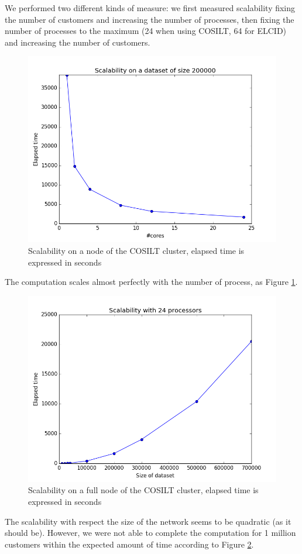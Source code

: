 \documentclass[a4paper,11pt]{book}
\begin{document}
We performed two different kinds of measure: we first measured scalability fixing the number of customers and increasing the number of processes, then fixing the number of processes to the maximum (24 when using COSILT, 64 for ELCID) and increasing the number of customers.
 \begin{figure}[H]
\centering
\includegraphics[height=7.0 cm,width=10 cm]{label_200K.png}
\caption{Scalability on a node of the COSILT cluster, elapsed time is expressed in seconds}\label{fig:200}
\end{figure}
The computation scales almost perfectly with the number of process, as Figure \ref{fig:200}.\\

 \begin{figure}[htbp]
\centering
\includegraphics[height=7.0 cm,width=10 cm]{24coresb.png}
\caption{Scalability on a full node of the COSILT cluster, elapsed time is expressed in seconds}\label{fig:problem}
\end{figure}
The scalability with respect the size of the network seems to be quadratic (as it should be). However, we were not able to complete the computation for 1 million customers within the expected amount of time according to Figure \ref{fig:problem}.\\
\end{document}
